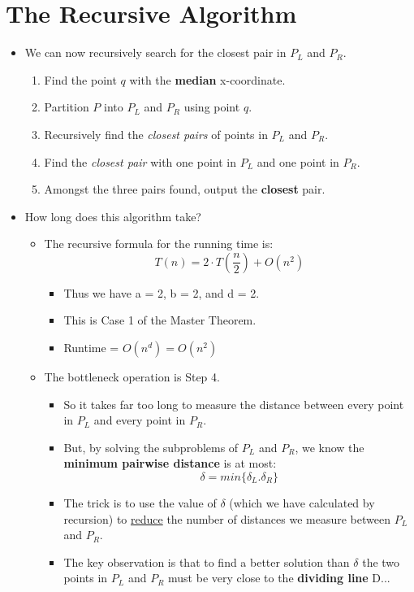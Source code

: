 \documentclass[12pt]{article}
\begin{document}
\section{The Recursive Algorithm}
\renewcommand{\labelitemii}{$\circ$}
\renewcommand{\labelitemiii}{$\cdot$}
\renewcommand{\labelitemiii}{$\rightarrow$}
\renewcommand{\labelitemiv}{$\star$}	
\begin{itemize}
	\item We can now recursively search for the closest pair in $P_L$ and $P_R$.
	\begin{enumerate}
	\item Find the point $q$ with the \textbf{median} x-coordinate.
	\item Partition $P$ into $P_L$ and $P_R$ using point $q$.
	\item Recursively find the \textit{closest pairs} of points in $P_L$ and $P_R$.
	\item Find the \textit{closest pair} with one point in $P_L$ and one point in $P_R$.
	\item Amongst the three pairs found, output the \textbf{closest} pair.
	\end{enumerate}
\item How long does this algorithm take?
	\begin{itemize}
	\item The recursive formula for the running time is:
	$$T(n) = 2 \cdot T(\frac{n}{2}) + O(n^2)$$
		\begin{itemize}
		\item Thus we have a = 2, b = 2, and d = 2.
		\item This is Case 1 of the Master Theorem.
		\item Runtime = $O(n^d) = O(n^2)$
		\end{itemize}
	\item The bottleneck operation is Step 4.
		\begin{itemize}
		\item So it takes far too long to measure the distance between every point in $P_L$ and every point in $P_R$.
		\item But, by solving the subproblems of $P_L$ and $P_R$, we know the \textbf{minimum pairwise distance} is at most: 
		$$ \delta = min\{\delta_L. \delta_R\}$$
		\item The trick is to use the value of $\delta$ (which we have calculated by recursion) to \underline{reduce} the number of distances we measure between $P_L$ and $P_R$.
		\item The key observation is that to find a better solution than $\delta$ the two points in $P_L$ and $P_R$ must be very close to the \textbf{dividing line} D...

\end{itemize}
\end{itemize}
\end{itemize}
\end{document}
